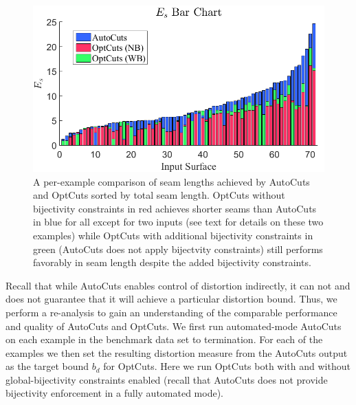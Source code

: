\begin{figure}[t]
\centering
\includegraphics[width=\linewidth]{fig/ESLBar_compAutoCuts.png}
\caption{
A per-example comparison of seam lengths achieved by 
AutoCuts and OptCuts sorted by total seam length. OptCuts without bijectivity constraints in red achieves shorter seams than AutoCuts in blue for all except for two inputs (see text for details on these two examples) while OptCuts with additional bijectivity constraints in green (AutoCuts does not apply bijectvity constraints) still performs favorably in seam length despite the added bijectivity constraints.
%
}
\label{fig:ESLBar_compAutoCuts}
\end{figure}


Recall that while AutoCuts enables control of distortion indirectly, it can not and does not guarantee that it will achieve a particular distortion bound. Thus, we perform a re-analysis to gain an understanding of the comparable performance and quality of AutoCuts and OptCuts. We first run automated-mode AutoCuts on each example in the benchmark data set to termination. For each of the examples we then set the resulting distortion measure from the AutoCuts output as the target bound $b_d$ for OptCuts. Here we run OptCuts both with and without global-bijectivity constraints enabled (recall that AutoCuts does not provide bijectivity enforcement in a fully automated mode). 

